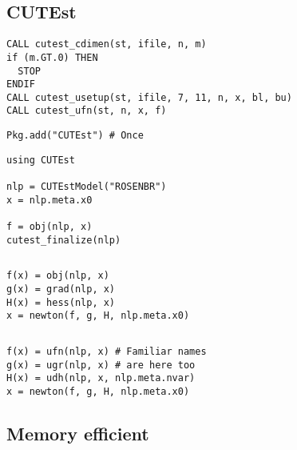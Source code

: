 \subsection{CUTEst}

\begin{frame}[t,fragile]
  \begin{verbatim}
CALL cutest_cdimen(st, ifile, n, m)
if (m.GT.0) THEN
  STOP
ENDIF
CALL cutest_usetup(st, ifile, 7, 11, n, x, bl, bu)
CALL cutest_ufn(st, n, x, f)
\end{verbatim}
\end{frame}

\begin{frame}[t,fragile]
  \begin{verbatim}
Pkg.add("CUTEst") # Once
\end{verbatim}
\begin{verbatim}
using CUTEst

nlp = CUTEstModel("ROSENBR")
x = nlp.meta.x0

f = obj(nlp, x)
cutest_finalize(nlp)
\end{verbatim}
\end{frame}

\begin{frame}[t,fragile]
  \inputminted{julia}{src/newton.jl}
\begin{verbatim}
f(x) = obj(nlp, x)
g(x) = grad(nlp, x)
H(x) = hess(nlp, x)
x = newton(f, g, H, nlp.meta.x0)
\end{verbatim}
\end{frame}

\begin{frame}[t,fragile]
  \inputminted{julia}{src/newton.jl}
\begin{verbatim}
f(x) = ufn(nlp, x) # Familiar names
g(x) = ugr(nlp, x) # are here too
H(x) = udh(nlp, x, nlp.meta.nvar)
x = newton(f, g, H, nlp.meta.x0)
\end{verbatim}
\end{frame}

\subsection{Memory efficient}

\begin{frame}[t,fragile]
  \inputminted{julia}{src/newtoninplace.jl}
\end{frame}


